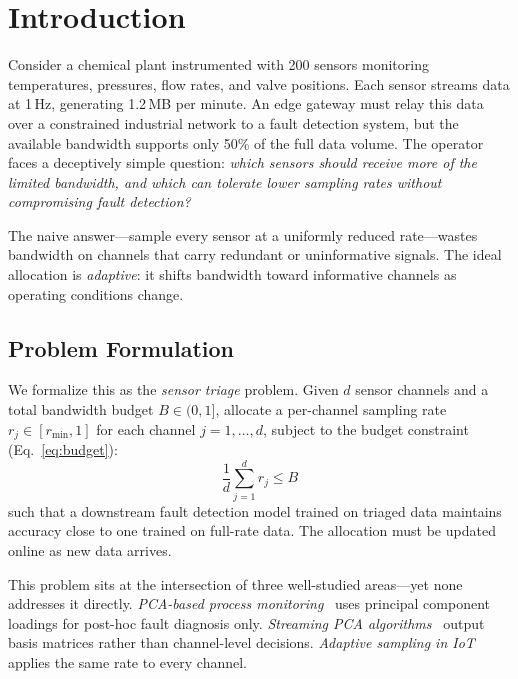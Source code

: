 \documentclass[journal]{IEEEtran}
\begin{document}
\section{Introduction}
\label{sec:intro}

Consider a chemical plant instrumented with 200 sensors monitoring temperatures, pressures, flow rates, and valve positions. Each sensor streams data at 1\,Hz, generating 1.2\,MB per minute. An edge gateway must relay this data over a constrained industrial network to a fault detection system, but the available bandwidth supports only 50\% of the full data volume. The operator faces a deceptively simple question: \textit{which sensors should receive more of the limited bandwidth, and which can tolerate lower sampling rates without compromising fault detection?}

The naive answer---sample every sensor at a uniformly reduced rate---wastes bandwidth on channels that carry redundant or uninformative signals. The ideal allocation is \textit{adaptive}: it shifts bandwidth toward informative channels as operating conditions change.

\subsection{Problem Formulation}

We formalize this as the \textit{sensor triage} problem. Given $d$ sensor channels and a total bandwidth budget $B \in (0, 1]$, allocate a per-channel sampling rate $r_j \in [r_{\min}, 1]$ for each channel $j = 1, \ldots, d$, subject to the budget constraint (Eq.~\ref{eq:budget}):
\begin{equation}
\frac{1}{d} \sum_{j=1}^{d} r_j \leq B
\label{eq:budget}
\end{equation}
such that a downstream fault detection model trained on triaged data maintains accuracy close to one trained on full-rate data. The allocation must be updated online as new data arrives.

This problem sits at the intersection of three well-studied areas---yet none addresses it directly. \textit{PCA-based process monitoring}~\cite{chen2013pca, processmonitoring2024survey, downs1993tep} uses principal component loadings for post-hoc fault diagnosis only. \textit{Streaming PCA algorithms}~\cite{weng2003ccipca, balzano2010grouse, yang2018historypca} output basis matrices rather than channel-level decisions. \textit{Adaptive sampling in IoT}~\cite{benaboud2021adaptive, giordano2023energy} applies the same rate to every channel.
\end{document}
